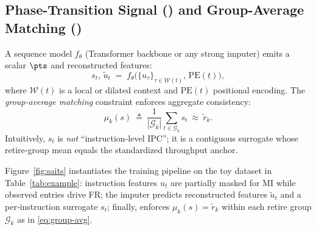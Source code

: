 \subsection{Phase-Transition Signal (\pts) and Group-Average Matching (\gam)}
A sequence model \(f_\theta\) (Transformer backbone or any strong imputer) emits a scalar \(\pts\) and reconstructed features:
\[
s_t,\,\tilde{u}_t \;=\; f_\theta\!\big(\{u_\tau\}_{\tau\in\mathcal{W}(t)},\,\mathrm{PE}(t)\big),
\]
where \(\mathcal{W}(t)\) is a local or dilated context and \(\mathrm{PE}(t)\) positional encoding. The \emph{group-average matching} constraint enforces aggregate consistency:
\begin{equation}
\mu_k(s)\ \triangleq\ \frac{1}{|\mathcal{G}_k|}\sum_{t\in\mathcal{G}_k}s_t\ \approx\ \tilde{r}_k.
\label{eq:group-avg}
\end{equation}
Intuitively, \(s_t\) is \emph{not} “instruction-level IPC”; it is a contiguous surrogate whose retire-group mean equals the standardized throughput anchor.

Figure~\ref{fig:saits} instantiates the training pipeline on the toy dataset in Table~\ref{tab:example}: instruction features \(u_t\) are partially masked for MI while observed entries drive FR; the imputer predicts reconstructed features \(\tilde{u}_t\) and a per‑instruction surrogate \(s_t\); finally, \gam enforces \(\mu_k(s)=\tilde{r}_k\) within each retire group \(\mathcal{G}_k\) as in \eqref{eq:group-avg}.

\begin{table}[!htbp]
\centering
\small
\caption{Example of profiled dataset from an initial simulation  with group \emph{anchors} for training.}
\label{tab:example}
\end{table}


